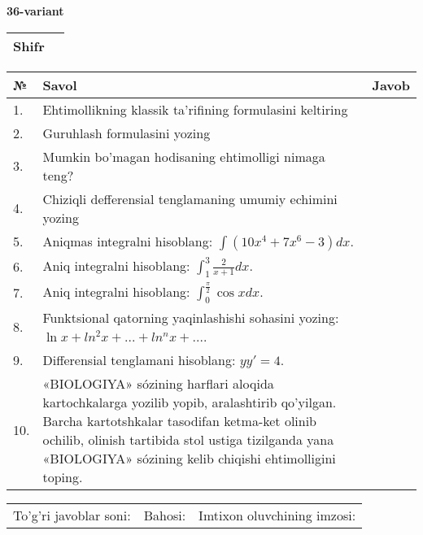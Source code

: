 \documentclass{article}
\begin{document}
  \egroup
  
  \newpage
  
  
  \textbf{36-variant}\\
  
  \bgroup
  \def\arraystretch{1.6} %
  
  \begin{tabular}{|m{5.7cm}|m{9.5cm}|}
  \hline
  Shifr & \\
  \hline
  \end{tabular}
  
  \vspace{1cm}
  
  \begin{tabular}{|m{0.7cm}|m{10cm}|m{4cm}|}
  \hline
  № & Savol & Javob \\
  \hline
  1. & Ehtimollikning klassik ta'rifining formulasini keltiring &  \\
  \hline
  2. & Guruhlash formulasini yozing &  \\
  \hline
  3. & Mumkin bo'magan hodisaning ehtimolligi nimaga teng? &  \\
  \hline
  4. & Chiziqli defferensial tenglamaning umumiy echimini yozing &  \\
  \hline
  5. & Aniqmas integralni hisoblang: \(\int {\left( 10x^{4} + 7x^{6} - 3 \right)dx}\). &  \\
  \hline
  6. & Aniq integralni hisoblang: \(\int_{1}^{3}\frac{2}{x + 1}dx\). &  \\
  \hline
  7. & Aniq integralni hisoblang: \(\int_{0}^{\frac{\pi}{2}}{\cos xdx}\). &  \\
  \hline
  8. & Funktsional qatorning yaqinlashishi sohasini yozing: \(\ln x + ln^{2}x + ... + ln^{n}x + ...\). &  \\
  \hline
  9. & Differensial tenglamani hisoblang: \(yy' = 4\). &  \\
  \hline
  10. & «BIOLOGIYA» sózining harflari aloqida kartochkalarga yozilib yopib, aralashtirib qo'yilgan. Barcha kartotshkalar tasodifan ketma-ket olinib ochilib, olinish tartibida stol ustiga tizilganda yana «BIOLOGIYA» sózining kelib chiqishi ehtimolligini toping. &  \\
  \hline
  \end{tabular}
  
  \vspace{1cm}
  
  \begin{tabular}{lll}
  To'g'ri javoblar soni: \underline{\hspace{1.5cm}} & 
  Bahosi: \underline{\hspace{1.5cm}} & 
  Imtixon oluvchining imzosi: \underline{\hspace{2cm}} \\
  \end{tabular}
  
\end{document}
